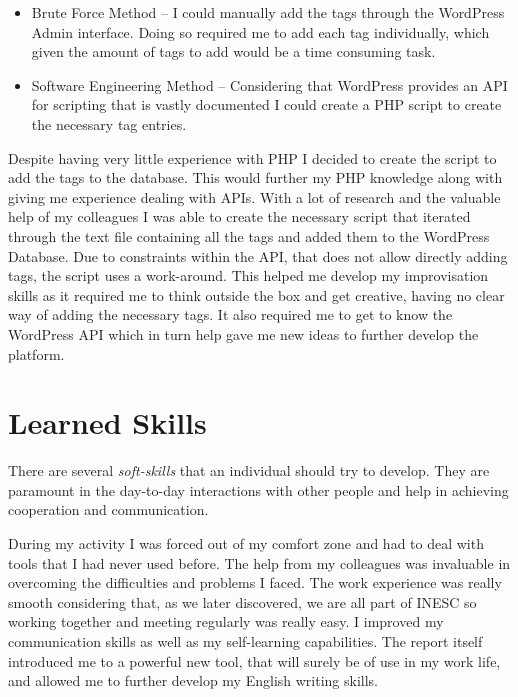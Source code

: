 \documentclass[a4paper,12pt,journal,twoside,compsoc]{PPIEEEtran}
\begin{document}
\begin{itemize}
	\item Brute Force Method -- I could manually add the tags through the WordPress Admin interface. Doing so  required me to add each tag individually, which given the amount of tags to add would be a time consuming task.
	\item Software Engineering Method -- Considering that WordPress provides an API for scripting that is vastly documented I could create a PHP script to create the necessary tag entries.
\end{itemize}

Despite having very little experience with PHP I decided to create the script to add the tags to the database. This would further my PHP knowledge along with giving me experience dealing with APIs. With a lot of research and the valuable help of my colleagues I was able to create the necessary script that iterated through the text file containing all the tags and added them to the WordPress Database. Due to constraints within the API, that does not allow directly adding tags, the script uses a work-around. This helped me develop my improvisation skills as it required me to think outside the box and get creative, having no clear way of adding the necessary tags.  It also required me to get to know the WordPress API which in turn help gave me new ideas to further develop the platform.

\section{Learned Skills}
There are several \textit{soft-skills} that an individual should try to develop. They are paramount in the day-to-day interactions with other people and help in achieving cooperation and communication. 

During my activity I was forced out of my comfort zone and had to deal with tools that I had never used before. The help from my colleagues was invaluable in overcoming the difficulties and problems I faced. The work experience was really smooth considering that, as we later discovered, we are all part of \ac{INESC} so working together and meeting regularly was really easy. I improved my communication skills as well as my self-learning capabilities. The report itself introduced me to a powerful new tool, that will surely be of use in my work life, and allowed me to further develop my English writing skills.
\end{document}
